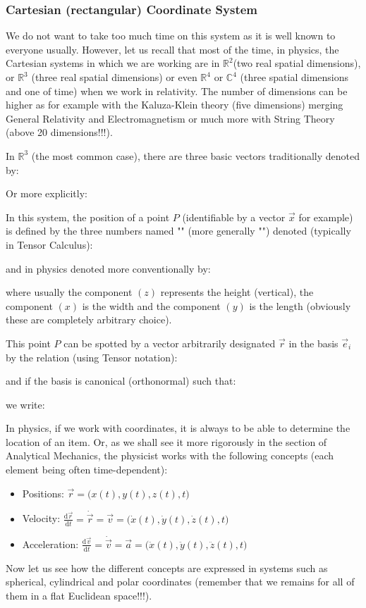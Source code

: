 	\subsubsection{Cartesian (rectangular) Coordinate System}
	We do not want to take too much time on this system as it is well known to everyone usually. However, let us recall that most of the time, in physics, the Cartesian systems in which we are working are in $\mathbb{R}^2 $(two real spatial dimensions), or $\mathbb{R}^3$ (three real spatial dimensions) or even $\mathbb{R}^4$ or $\mathbb{C}^4$ (three spatial dimensions and one of time) when we work in relativity. The number of dimensions can be higher as for example with the Kaluza-Klein theory (five dimensions) merging General Relativity and Electromagnetism or much more with String Theory (above 20 dimensions!!!).
	
	In $\mathbb{R}^3$ (the most common case), there are three basic vectors traditionally denoted by:
	
	Or more explicitly:
	
	
	In this system, the position of a point $P$ (identifiable by a vector $\vec{x}$ for example) is defined by the three numbers named  "" (more generally "") denoted (typically in Tensor Calculus):
	
	and in physics denoted more conventionally by:
	
	where usually the component $(z)$ represents the height (vertical), the component $(x)$ is the width and the component  $(y)$ is the length (obviously these are completely arbitrary choice).
	
	This point $P$ can be spotted by a vector arbitrarily designated $\vec{r}$ in the basis  $\vec{e}_i$ by the relation (using Tensor notation):
	
	and if the basis is canonical (orthonormal) such that:
	
	we write:
	
	In physics, if we work with coordinates, it is always to be able to determine the location of an item. Or, as we shall see it more rigorously in the section of Analytical Mechanics, the physicist works with the following concepts (each element being often time-dependent):
	\begin{itemize}
		\item Positions: $\vec{r}=\biggl(x(t),y(t),z(t),t\biggr)$
		
		\item Velocity: $\displaystyle\frac{\mathrm{d}\vec{r}}{\mathrm{d}t}=\dot{\vec{r}}=\vec{v}
	=\biggl(\dot{x}(t),\dot{y}(t),\dot{z}(t),t\biggr)$
	
		\item Acceleration: $\displaystyle\frac{\mathrm{d}\vec{v}}{\mathrm{d}t}=\dot{\vec{v}}=\vec{a}=
	\biggl(\ddot{x}(t),\ddot{y}(t),\ddot{z}(t),t\biggr)$
	\end{itemize}
	Now let us see how the different concepts are expressed in systems such as spherical, cylindrical and polar coordinates (remember that we remains for all of them in a flat Euclidean space!!!).
	
